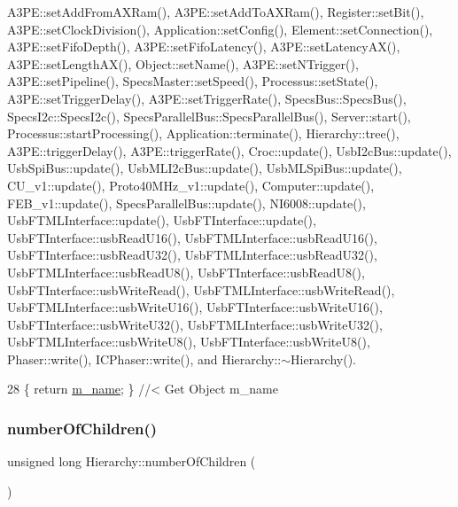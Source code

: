 A3\+P\+E\+::set\+Add\+From\+A\+X\+Ram(), A3\+P\+E\+::set\+Add\+To\+A\+X\+Ram(), Register\+::set\+Bit(), A3\+P\+E\+::set\+Clock\+Division(), Application\+::set\+Config(), Element\+::set\+Connection(), A3\+P\+E\+::set\+Fifo\+Depth(), A3\+P\+E\+::set\+Fifo\+Latency(), A3\+P\+E\+::set\+Latency\+A\+X(), A3\+P\+E\+::set\+Length\+A\+X(), Object\+::set\+Name(), A3\+P\+E\+::set\+N\+Trigger(), A3\+P\+E\+::set\+Pipeline(), Specs\+Master\+::set\+Speed(), Processus\+::set\+State(), A3\+P\+E\+::set\+Trigger\+Delay(), A3\+P\+E\+::set\+Trigger\+Rate(), Specs\+Bus\+::\+Specs\+Bus(), Specs\+I2c\+::\+Specs\+I2c(), Specs\+Parallel\+Bus\+::\+Specs\+Parallel\+Bus(), Server\+::start(), Processus\+::start\+Processing(), Application\+::terminate(), Hierarchy\+::tree(), A3\+P\+E\+::trigger\+Delay(), A3\+P\+E\+::trigger\+Rate(), Croc\+::update(), Usb\+I2c\+Bus\+::update(), Usb\+Spi\+Bus\+::update(), Usb\+M\+L\+I2c\+Bus\+::update(), Usb\+M\+L\+Spi\+Bus\+::update(), C\+U\+\_\+v1\+::update(), Proto40\+M\+Hz\+\_\+v1\+::update(), Computer\+::update(), F\+E\+B\+\_\+v1\+::update(), Specs\+Parallel\+Bus\+::update(), N\+I6008\+::update(), Usb\+F\+T\+M\+L\+Interface\+::update(), Usb\+F\+T\+Interface\+::update(), Usb\+F\+T\+Interface\+::usb\+Read\+U16(), Usb\+F\+T\+M\+L\+Interface\+::usb\+Read\+U16(), Usb\+F\+T\+Interface\+::usb\+Read\+U32(), Usb\+F\+T\+M\+L\+Interface\+::usb\+Read\+U32(), Usb\+F\+T\+M\+L\+Interface\+::usb\+Read\+U8(), Usb\+F\+T\+Interface\+::usb\+Read\+U8(), Usb\+F\+T\+Interface\+::usb\+Write\+Read(), Usb\+F\+T\+M\+L\+Interface\+::usb\+Write\+Read(), Usb\+F\+T\+M\+L\+Interface\+::usb\+Write\+U16(), Usb\+F\+T\+Interface\+::usb\+Write\+U16(), Usb\+F\+T\+Interface\+::usb\+Write\+U32(), Usb\+F\+T\+M\+L\+Interface\+::usb\+Write\+U32(), Usb\+F\+T\+M\+L\+Interface\+::usb\+Write\+U8(), Usb\+F\+T\+Interface\+::usb\+Write\+U8(), Phaser\+::write(), I\+C\+Phaser\+::write(), and Hierarchy\+::$\sim$\+Hierarchy().


\begin{DoxyCode}
28 \{ \textcolor{keywordflow}{return} \hyperlink{classObject_a8b83c95c705d2c3ba0d081fe1710f48d}{m\_name}; \} \textcolor{comment}{//< Get Object m\_name}
\end{DoxyCode}
\mbox{\label{classHierarchy_ab16e84de65fd84e14001a6cf941c8be4}} 
\subsubsection{\texorpdfstring{number\+Of\+Children()}{numberOfChildren()}}
{\footnotesize\ttfamily unsigned long Hierarchy\+::number\+Of\+Children (\begin{DoxyParamCaption}{ }\end{DoxyParamCaption})\hspace{0.3cm}{\ttfamily [inherited]}}



